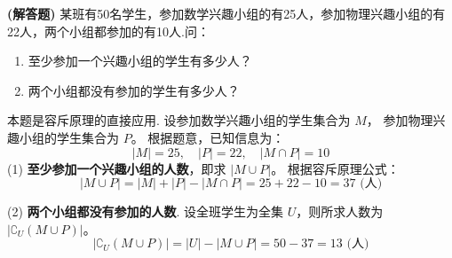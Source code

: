 \begin{prob}[topic={容斥原理初步应用}, score=10]
\textbf{(解答题)} 某班有50名学生，参加数学兴趣小组的有25人，参加物理兴趣小组的有22人，两个小组都参加的有10人.问：
\begin{enumerate}
	\item 至少参加一个兴趣小组的学生有多少人？
	\item 两个小组都没有参加的学生有多少人？
\end{enumerate}
\end{prob}
\begin{prob-sol}
本题是容斥原理的直接应用.
设参加数学兴趣小组的学生集合为 $M$，
参加物理兴趣小组的学生集合为 $P$。
根据题意，已知信息为：
\[ \lvert M\rvert = 25, \quad \lvert P\rvert = 22, \quad \lvert M \cap P\rvert = 10 \]
(1) \textbf{至少参加一个兴趣小组的人数}，即求 $\lvert M \cup P\rvert$。
根据容斥原理公式：
\[ \lvert M \cup P\rvert = \lvert M\rvert + \lvert P\rvert - \lvert M \cap P\rvert = 25 + 22 - 10 = 37 \text{ (人)} \]

(2) \textbf{两个小组都没有参加的人数}.
设全班学生为全集 $U$，则所求人数为 $\lvert\complement_U(M \cup P)\rvert$。
\[ \lvert\complement_U(M \cup P)\rvert = \lvert U\rvert - \lvert M \cup P\rvert = 50 - 37 = 13 \text{ (人)} \]
\end{prob-sol}
